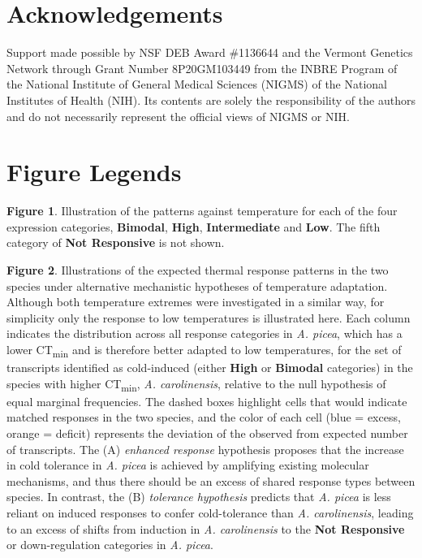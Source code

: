 \documentclass[]{article}
\begin{document}
\section{Acknowledgements}\label{acknowledgements}

Support made possible by NSF DEB Award \#1136644 and the Vermont
Genetics Network through Grant Number 8P20GM103449 from the INBRE
Program of the National Institute of General Medical Sciences (NIGMS) of
the National Institutes of Health (NIH). Its contents are solely the
responsibility of the authors and do not necessarily represent the
official views of NIGMS or NIH.

\section{Figure Legends}\label{figure-legends}

\textbf{Figure 1}. Illustration of the patterns against temperature for
each of the four expression categories, \textbf{Bimodal}, \textbf{High},
\textbf{Intermediate} and \textbf{Low}. The fifth category of
\textbf{Not Responsive} is not shown.

\textbf{Figure 2}. Illustrations of the expected thermal response
patterns in the two species under alternative mechanistic hypotheses of
temperature adaptation. Although both temperature extremes were
investigated in a similar way, for simplicity only the response to low
temperatures is illustrated here. Each column indicates the distribution
across all response categories in \emph{A. picea}, which has a lower
CT\textsubscript{min} and is therefore better adapted to low
temperatures, for the set of transcripts identified as cold-induced
(either \textbf{High} or \textbf{Bimodal} categories) in the species
with higher CT\textsubscript{min}, \emph{A. carolinensis}, relative to
the null hypothesis of equal marginal frequencies. The dashed boxes
highlight cells that would indicate matched responses in the two
species, and the color of each cell (blue = excess, orange = deficit)
represents the deviation of the observed from expected number of
transcripts. The (A) \emph{enhanced response} hypothesis proposes that
the increase in cold tolerance in \emph{A. picea} is achieved by
amplifying existing molecular mechanisms, and thus there should be an
excess of shared response types between species. In contrast, the (B)
\emph{tolerance hypothesis} predicts that \emph{A. picea} is less
reliant on induced responses to confer cold-tolerance than \emph{A.
carolinensis}, leading to an excess of shifts from induction in \emph{A.
carolinensis} to the \textbf{Not Responsive} or down-regulation
categories in \emph{A. picea}.
\end{document}
